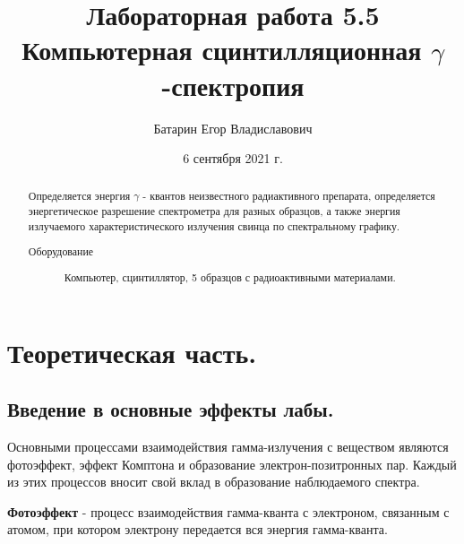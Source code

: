 \documentclass[%
 reprint,
 amsmath,amssymb,
 aps,
]{revtex4-2}
\begin{document}
\title{Лабораторная работа 5.5\\Компьютерная сцинтилляционная $\gamma$-спектропия}%



\author{Батарин Егор Владиславович}
%


\date{6 сентября 2021 г.}%
             

\begin{abstract}
Определяется энергия $\gamma$ - квантов неизвестного радиактивного препарата, определяется энергетическое разрешение спектрометра для разных образцов, а также энергия излучаемого характеристического излучения свинца по спектральному графику.
\begin{description}
\item[Оборудование]
Компьютер, сцинтиллятор, 5 образцов с радиоактивными материалами.
\end{description}
\end{abstract}

\maketitle


\section{Теоретическая часть.}
\subsection{Введение в основные эффекты лабы.}


Основными процессами взаимодействия гамма-излучения с веществом
являются фотоэффект, эффект Комптона и образование электрон-позитронных пар. Каждый из этих процессов вносит свой вклад в образование наблюдаемого спектра. 

\textbf{Фотоэффект} - процесс взаимодействия гамма-кванта с электроном, связанным с атомом, 
при котором электрону передается вся энергия гамма-кванта.
\end{document}
